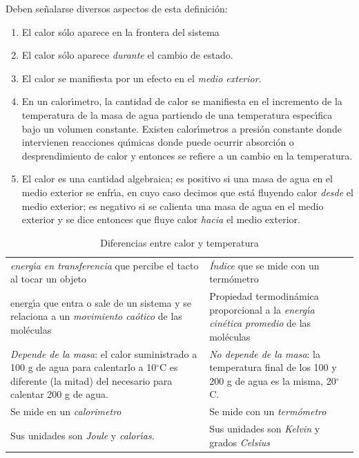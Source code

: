 Deben se\~nalarse diversos aspectos de esta definici\'on:
\begin{enumerate}
\item El calor s\'olo aparece en la frontera del sistema
\item El calor s\'olo aparece \textit{durante} el cambio de estado.
\item El calor se manifiesta por un efecto en el \textit{medio exterior}.
\item En un calor\'{\i}metro, la cantidad de calor se manifiesta en el incremento de la temperatura de la masa de agua  partiendo de una temperatura espec\'{\i}fica bajo un volumen constante. Existen calor\'{\i}metros a presi\'on constante donde intervienen reacciones qu\'{\i}micas donde puede ocurrir absorci\'on o desprendimiento de calor y entonces se refiere a un cambio en la temperatura.  
\item El calor es una cantidad algebraica; es positivo si una masa de agua en el medio exterior se enfr\'{\i}a, en cuyo caso decimos que est\'a fluyendo calor \textit{desde} el medio exterior; es negativo  si se calienta una masa de agua en el medio exterior y se dice entonces que fluye calor \textit{hacia} el medio exterior.
\end{enumerate}

\begin{table}[ht]
\caption{Diferencias entre calor y temperatura}
\label{tab:2}
\begin{center}
{\small \begin{tabularx}{.9\linewidth}{XX} \hline
   \hskip .7in \textbf{Calor}& \hskip .4in   
\textbf{Temperatura}\\  \hline
\textit{energ\'{\i}a en transferencia} que  percibe el tacto al tocar un objeto 
 & \textit{\'Indice} que se mide con un term\'ometro\\ 
 
energ\'{\i}a que entra o sale de un sistema y se relaciona a un \textit{movimiento ca\'otico}
de las mol\'eculas&
 Propiedad termodin\'amica  proporcional a la \textit{energ\'{\i}a} \textit{cin\'etica
promedio} de las mol\'eculas\\ 
\textit{Depende de la masa}: el calor suministrado a 100 g de agua para calentarlo a
10$^\circ$C es diferente (la mitad) del necesario para calentar 200 g de agua. &\textit{No depende de
la masa}: la temperatura final de los 100 y 200 g de agua es la misma, 20$^\circ$C. \\ 
Se mide en un \textit{\gls{calorimetro}} \index{calor\'{\i}metro}&Se mide con un
\textit{term\'ometro} \index{term\'ometro}\\
Sus unidades son \textit{Joule} y \textit{calor\'{\i}as.} &
 Sus unidades son \textit{Kelvin} y grados \textit{Celsius}\\ \hline
\end{tabularx}}
\end{center}
\end{table}

